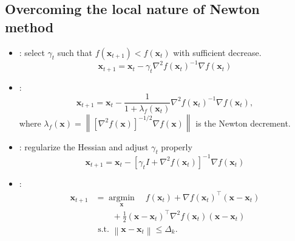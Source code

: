 \subsection*{Overcoming the local nature of Newton method}
\begin{itemize}[leftmargin=*]
    \item {}: select $\gamma_{t}$ such that $f\left(\mathbf{x}_{t+1}\right)<f\left(\mathbf{x}_{t}\right)$ with sufficient decrease.
$$
\mathbf{x}_{t+1}=\mathbf{x}_{t}-\gamma_{t} \nabla^{2} f\left(\mathbf{x}_{t}\right)^{-1} \nabla f\left(\mathbf{x}_{t}\right)
$$
    \item {}:
$$
\mathbf{x}_{t+1}=\mathbf{x}_{t}-\frac{1}{1+\lambda_{f}\left(\mathbf{x}_{t}\right)} \nabla^{2} f\left(\mathbf{x}_{t}\right)^{-1} \nabla f\left(\mathbf{x}_{t}\right),
$$
where $\lambda_{f}(\mathbf{x})=\left\|\left[\nabla^{2} f(\mathbf{x})\right]^{-1 / 2} \nabla f(\mathbf{x})\right\|$ is the Newton decrement.
    \item {}: regularize the Hessian and adjust $\gamma_{t}$ properly
$$
\mathbf{x}_{t+1}=\mathbf{x}_{t}-\left[\gamma_{t} I+\nabla^{2} f\left(\mathbf{x}_{t}\right)\right]^{-1} \nabla f\left(\mathbf{x}_{t}\right)
$$
    \item {}:
$$
\begin{aligned}
\mathbf{x}_{t+1}&=\underset{\mathbf{x}}{\operatorname{argmin}} \quad f\left(\mathbf{x}_{t}\right)+\nabla f\left(\mathbf{x}_{t}\right)^{\top}\left(\mathbf{x}-\mathbf{x}_{t}\right) \\
&\quad \quad +\frac{1}{2}\left(\mathbf{x}-\mathbf{x}_{t}\right)^{\top} \nabla^{2} f\left(\mathbf{x}_{t}\right)\left(\mathbf{x}-\mathbf{x}_{t}\right) \\
& \text { s.t. }\left\|\mathbf{x}-\mathbf{x}_{t}\right\| \leq \Delta_{k} .
\end{aligned}
$$
\end{itemize}







